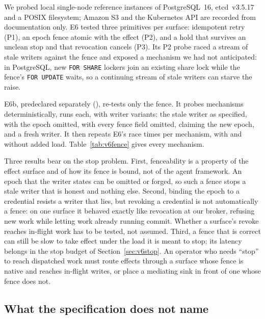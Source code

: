  We probed local single-node reference instances of PostgreSQL~16, etcd~v3.5.17 and a POSIX
filesystem; Amazon S3 and the Kubernetes API are recorded from documentation only. E6 tested three primitives per
surface: idempotent retry (P1), an epoch fence atomic with the effect (P2), and a hold that survives an unclean stop and
that revocation cancels (P3). \vsixESixPOneThreeSentence{} Its P2 probe raced a stream of stale writers against the
fence and exposed a mechanism we had not anticipated: in PostgreSQL, new \texttt{FOR SHARE} lockers join an existing
share lock while the fence's \texttt{FOR UPDATE} waits, so a continuing stream of stale writers can starve the raise.

E6b, predeclared separately (), re-tests only the fence. It probes
\vsixESixBMechanisms{} mechanisms deterministically, \vsixESixBRuns{} runs each, with \vsixESixBVariants{} writer
variants: the stale writer as specified, with the epoch
omitted, with every fence field omitted, claiming the new epoch, and a fresh writer. It then repeats E6's race
\vsixESixBStarvationN{} times per mechanism, with and without added load. \vsixESixBSentence{} Table~\ref{tab:v6fence}
gives every mechanism.



 Three results bear on the stop problem. First, fenceability is a property of the effect surface and of
how its fence is bound, not of the agent framework. An epoch that the writer states can be omitted or forged, so such a
fence stops a stale writer that is honest and nothing else. Second, binding the epoch to a credential resists a writer
that lies, but revoking a credential is not automatically a fence: on one surface it behaved exactly like revocation at
our broker, refusing new work while letting work already running commit. Whether a surface's revoke reaches in-flight
work has to be tested, not assumed. Third, a fence that is correct can still be slow to take effect under the load it is
meant to stop; its latency belongs in the stop budget of Section~\ref{sec:v6stop}. An operator who needs ``stop'' to
reach dispatched work must route effects through a surface whose fence is native and reaches in-flight writes, or place
a mediating sink in front of one whose fence does not.

\subsection{What the specification does not name}

